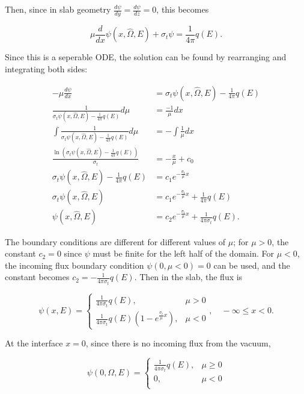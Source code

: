 \documentclass{hw-template}
\begin{document}
Then, since in slab geometry $\frac{d\psi}{dy} = \frac{d\psi}{dz} = 0$, this becomes

\begin{equation}
    \mu \frac{d}{dx}\psi(x, \hat{\Omega}, E) + \sigma_t \psi = \frac{1}{4\pi}q(E).
\end{equation}

Since this is a seperable ODE, the solution can be found by rearranging and integrating both sides:


\begin{align}
    -\mu \frac{d\psi}{dx} &= \sigma_t \psi(x, \hat{\Omega}, E) - \frac{1}{4\pi}q(E) \\
    \frac{1}{ \sigma_t \psi(x, \hat{\Omega}, E)  - \frac{1}{4\pi}q(E)} d\mu &= \frac{-1}{\mu}dx\\
    \int \frac{1}{ \sigma_t \psi(x, \hat{\Omega}, E)  - \frac{1}{4\pi}q(E)} d\mu &=-\int \frac{1}{\mu}dx\\
    \frac{\ln\left(\sigma_t \psi(x, \hat{\Omega}, E)  - \frac{1}{4\pi}q(E)\right)}{\sigma_t} &= -\frac{x}{\mu} + c_0\\
    \sigma_t \psi (x, \hat{\Omega}, E) - \frac{1}{4\pi}q(E) &= c_1 e^{-\frac{\sigma_t}{\mu}x}\\
    \sigma_t \psi(x, \hat{\Omega}, E)   &= c_1 e^{-\frac{\sigma_t}{\mu}x} + \frac{1}{4\pi}q(E)\\
    \psi(x, \hat{\Omega}, E)   &= c_2 e^{-\frac{\sigma_t}{\mu}x} + \frac{1}{4\pi\sigma_t }q(E).
\end{align}

The boundary conditions are different for different values of $\mu$; for $\mu>0$, the constant $c_2=0$ since $\psi$ must be finite for the left half of the domain. For $\mu<0$, the incoming flux boundary condition $\psi(0, \mu<0) = 0$ can be used, and the constant becomes $c_2 = -\frac{1}{4\pi \sigma_t} q(E)$. Then in the slab, the flux is

\begin{equation}
    \psi(x, E)   = \begin{cases}
    \frac{1}{4\pi\sigma_t }q(E), & \mu>0\\
    \frac{1}{4\pi\sigma_t }q(E) \left(1 - e^{\frac{\sigma_t}{\mu}x} \right), & \mu<0
    \end{cases} , \quad -\infty \leq x < 0.
\end{equation}

At the interface $x=0$, since there is no incoming flux from the vacuum, 

\begin{equation}
    \psi(0, \Omega, E) = \begin{cases}
        \frac{1}{4\pi\sigma_t }q(E), & \mu\geq0\\
        0, & \mu < 0\\
    \end{cases}
\end{equation}
\end{document}
